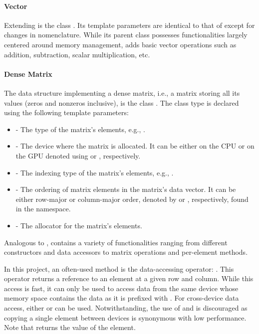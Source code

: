 \paragraph{Vector} Extending  is the  class \cite{ixA8ZYptYohwlgwt}. Its template parameters are identical to that of  except for changes in nomenclature. While its parent class possesses functionalities largely centered around memory management,  adds basic vector operations such as addition, subtraction, scalar multiplication, etc.

\paragraph{Dense Matrix} The data structure implementing a dense matrix, i.e., a matrix storing all its values (zeros and nonzeros inclusive), is the  class \cite{ixA8ZYptYohwlgwt}. The class type is declared using the following template parameters:

\begin{itemize}
	\item {} - The type of the matrix's elements, e.g., .
	\item {} - The device where the matrix is allocated. It can be either on the CPU or on the GPU denoted using  or , respectively.
	\item {} - The indexing type of the matrix's elements, e.g., .
	\item {} - The ordering of matrix elements in the matrix's data vector. It can be either row-major or column-major order, denoted by  or , respectively, found in the  namespace.
	\item {} - The allocator for the matrix's elements.
\end{itemize}

Analogous to ,  contains a variety of functionalities ranging from different constructors and data accessors to matrix operations and per-element methods.

In this project, an often-used method is the data-accessing operator: . This operator returns a reference to an element at a given row and column. While this access is fast, it can only be used to access data from the same device whose memory space contains the data as it is prefixed with . For cross-device data access, either  or  can be used. Notwithstanding, the use of  and  is discouraged as copying a single element between devices is synonymous with low performance. Note that  returns the value of the element.

